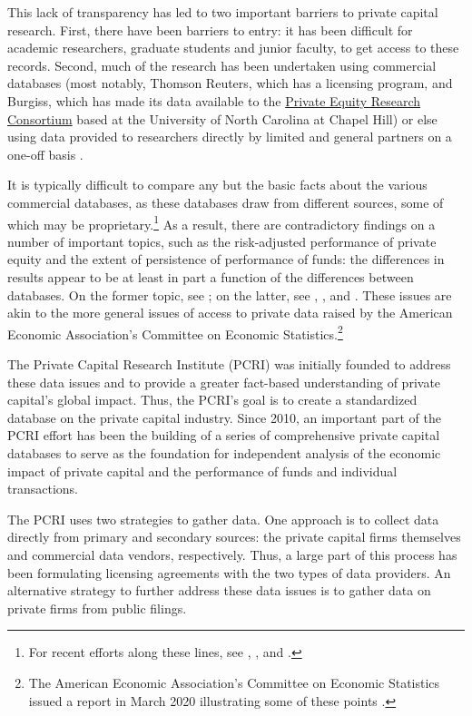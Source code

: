 This lack of transparency has led to two important barriers to private capital research. First, there have been barriers to entry: it has been difficult for academic researchers, graduate students and junior faculty, to get access to these records. Second, much of the research has been undertaken using commercial databases (most notably, Thomson Reuters, which has a licensing program, and Burgiss, which has made its data available to the \href{http://uncipc.org/index.php/initiativecat/private-equity/}{Private Equity Research Consortium} based at the University of North Carolina at Chapel Hill) or else using data provided to researchers directly by limited and general partners on a one-off basis \citep[e.g.,][]{gompers1997}.

It is typically difficult to compare any but the basic facts about the various commercial databases, as these databases draw from different sources, some of which may be proprietary.\footnote{For recent efforts along these lines, see \citet{brown2015}, \citet{maats2011}, and \citet{kaplan2017}.} As a result, there are contradictory findings on a number of important topics, such as the risk-adjusted performance of private equity and the extent of persistence of performance of funds: the differences in results appear to be at least in part a function of the differences between databases. On the former topic, see \citet{korteweg2019}; on the latter, see \citet{braun2017}, \citet{harris2014}, and \citet{korteweg2015}. These issues are akin to the more general issues of access to private data raised by the American Economic Association's Committee on Economic Statistics.\footnote{The American Economic Association's Committee on Economic Statistics issued a report in March 2020 illustrating some of these points \citep{aeaces2020}.}

The Private Capital Research Institute (PCRI) was initially founded to address these data issues and to provide a greater fact-based understanding of private capital's global impact. Thus, the PCRI's goal is to create a standardized database on the private capital industry. Since 2010, an important part of the PCRI effort has been the building of a series of comprehensive private capital databases to serve as the foundation for independent analysis of the economic impact of private capital and the performance of funds and individual transactions.

The PCRI uses two strategies to gather data. One approach is to collect data directly from primary and secondary sources: the private capital firms themselves and commercial data vendors, respectively. Thus, a large part of this process has been formulating licensing agreements with the two types of data providers. An alternative strategy to further address these data issues is to gather data on private firms from public filings.

